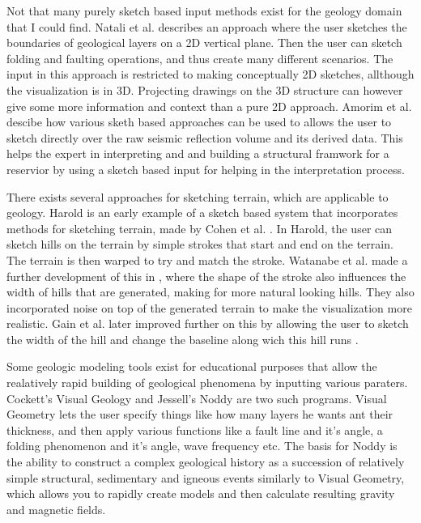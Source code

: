 \documentclass[a4paper,12pt]{report}
\begin{document}
Not that many purely sketch based input methods exist for the geology domain that I could find. Natali et al. \cite{natalirapid} describes an approach where the user sketches the boundaries of geological layers on a 2D vertical plane. Then the user can sketch folding and faulting operations, and thus create many different scenarios. The input in this approach is restricted to making conceptually 2D sketches, allthough the visualization is in 3D. Projecting drawings on the 3D structure can however give some more information and context than a pure 2D approach. Amorim et al. \cite{amorim2012sketch} descibe how various sketh based approaches can be used to allows the user to sketch directly over the raw seismic reflection volume and its derived data. This helps the expert in interpreting and and building a structural framwork for a reservior by using a sketch based input for helping in the interpretation process.

There exists several approaches for sketching terrain, which are applicable to geology. Harold is an early example of a sketch based system that incorporates methods for sketching terrain, made by Cohen et al. \cite{cohen2000harold}. In Harold, the user can sketch hills on the terrain by simple strokes that start and end on the terrain. The terrain is then warped to try and match the stroke. Watanabe et al. made a further development of this in \cite{Watanabe:2004:SIT:1186415.1186500}, where the shape of the stroke also influences the width of hills that are generated, making for more natural looking hills. They also incorporated noise on top of the generated terrain to make the visualization more realistic. Gain et al. later improved further on this by allowing the user to sketch the width of the hill and change the baseline along wich this hill runs \cite{Gain:2009:TS:1507149.1507155}.

Some geologic modeling tools exist for educational purposes that allow the realatively rapid building of geological phenomena by inputting various paraters. Cockett's Visual Geology \cite{Cockett:Online} and Jessell's Noddy \cite{jessell1981noddy} are two such programs. Visual Geometry lets the user specify things like how many layers he wants ant their thickness, and then apply various functions like a fault line and it's angle, a folding phenomenon and it's angle, wave frequency etc. The basis for Noddy is the ability to construct a complex geological history as a succession of relatively simple structural, sedimentary and igneous events similarly to Visual Geometry, which allows you to rapidly create models and then calculate resulting gravity and magnetic fields.
\end{document}
